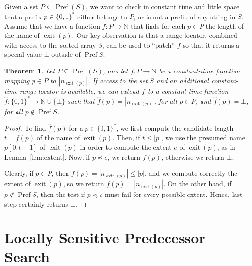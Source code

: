 \documentclass[a4paper,11pt]{article}
\newtheorem{theorem} {Theorem}[section]
\newcommand{\N}{\mathbb{N}}
\newcommand{\?}{\mskip1.5mu}
\DeclareMathOperator{\exit}{exit}
\DeclareMathOperator{\Pref}{Pref}
\begin{document}
Given a set $P\subseteq \Pref(S)$, we want to check in constant time
and little space that a prefix $p \in \{0, 1\}^*$ either belongs 
to $P$, or is not a prefix of any string in $S$. Assume that we 
have a function $f : P \rightarrow \N$ that finds for each
$p\in P$ the length of the name of $\exit(p)$. 
Our key observation is that a range locator, combined with access 
to the sorted array $S$, can be used to ``patch''
$f$ so that it returns a special value $\bot$ outside of $\Pref S$:
\begin{theorem}
\label{th:pref}
Let $P \subseteq\Pref(S)$, and let $f: P \rightarrow \N$ be 
a constant-time function mapping $p \in P$ to $|n_{\exit(p)}|$. 
If access to the set $S$ and an additional
constant-time range locator is available, we can extend 
$f$ to a constant-time function $\widehat{f}: \{0, 1\}^* \rightarrow \N
\cup \{ \bot \}$ such that $\widehat{f}(p)=|n_{\exit(p)}|$, for 
all $p \in P$, and $\widehat{f}(p) = \bot$, for
all $p \not\in\Pref S$.
\end{theorem}
\begin{proof}

To find $\widehat{f}(p)$ for a $p \in \{0, 1\}^*$, 
we first compute the candidate length $t = f(p)$ of the name of 
$\exit(p)$. Then, if $t \leq |p|$, we use the presumed
name $p[0, t -1]$ of $\exit(p)$ in order to compute 
the extent $e$ of $\exit(p)$, as in Lemma~\ref{lem:extent}. Now, 
if $p  \preceq e$, we return $f(p)$, otherwise we return $\bot$.

Clearly, if $p\in P$, then $f(p) = |n_{\exit(p)}| \leq |p|$, and we
compute correctly the extent of $\exit(p)$, so we return 
$f(p)=|n_{\exit(p)}|$.
On the other hand, if $p \not\in \Pref S$, then the test if 
$p \preceq e$ must fail for every possible extent. 
Hence, last step certainly returns $\bot$.
\end{proof}


\section{Locally Sensitive Predecessor Search}
\label{sec:pred}
\end{document}
